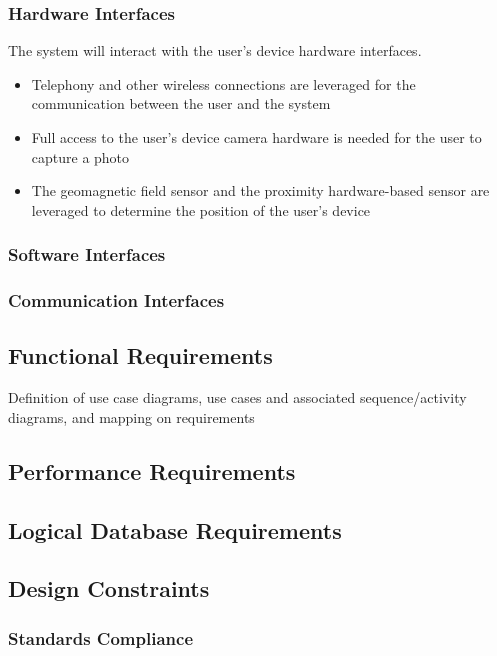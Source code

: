 \subsubsection{Hardware Interfaces}

The system will interact with the user's device hardware interfaces.	
	\begin{itemize} 
		\item Telephony and other wireless connections are leveraged for the communication between the user and the system
		\item Full access to the user's device camera hardware is needed for the user to capture a photo
		\item The geomagnetic field sensor and the proximity hardware-based sensor are leveraged to determine the position of the user's device
	\end{itemize}
	
\subsubsection{Software Interfaces}
\subsubsection{Communication Interfaces}


\subsection{Functional Requirements}
Definition of use case diagrams, use cases and associated sequence/activity diagrams, and mapping on requirements

\subsection{Performance Requirements}

\subsection{Logical Database Requirements}

\subsection{Design Constraints}

\subsubsection{Standards Compliance}
